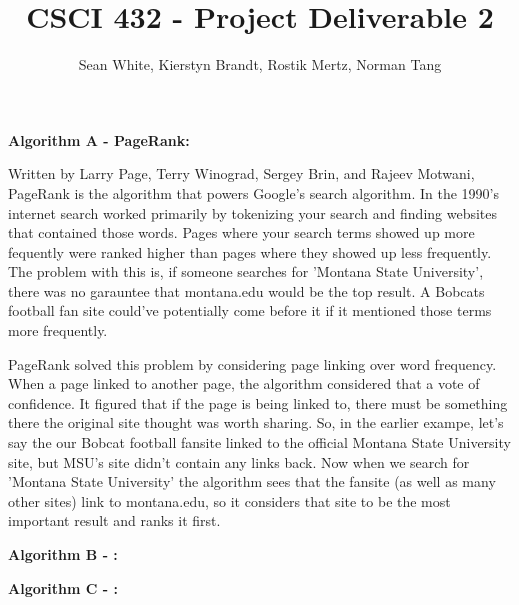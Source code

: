 \documentclass[12pt]{article}
\author{Sean White, Kierstyn Brandt, Rostik Mertz, Norman Tang}
\title{CSCI 432 - Project Deliverable 2}
\begin{document}
\maketitle

\noindent
\textbf{Algorithm A - PageRank:}\smallskip

Written by Larry Page, Terry Winograd, Sergey Brin, and Rajeev Motwani, PageRank is the algorithm that powers Google's search algorithm. In the 1990's internet search worked primarily by tokenizing your search and finding websites that contained those words. Pages where your search terms showed up more fequently were ranked higher than pages where they showed up less frequently. The problem with this is, if someone searches for 'Montana State University', there was no garauntee that montana.edu would be the top result. A Bobcats football fan site could've potentially come before it if it mentioned those terms more frequently.

PageRank solved this problem by considering page linking over word frequency. When a page linked to another page, the algorithm considered that a vote of confidence. It figured that if the page is being linked to, there must be something there the original site thought was worth sharing. So, in the earlier exampe, let's say the our Bobcat football fansite linked to the official Montana State University site, but MSU's site didn't contain any links back. Now when we search for 'Montana State University' the algorithm sees that the fansite (as well as many other sites) link to montana.edu, so it considers that site to be the most important result and ranks it first.
\bigskip

\noindent
\textbf{Algorithm B - :}\smallskip

\bigskip
\noindent
\textbf{Algorithm C - :}\smallskip
\end{document}
